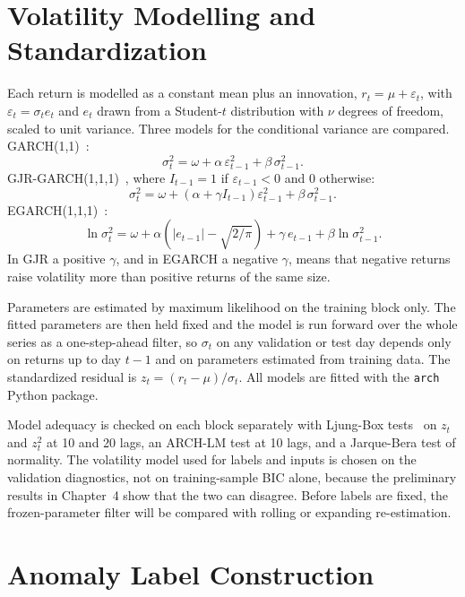 \section{Volatility Modelling and Standardization}
Each return is modelled as a constant mean plus an innovation, $r_t = \mu + \varepsilon_t$,
with $\varepsilon_t = \sigma_t e_t$ and $e_t$ drawn from a Student-$t$ distribution with
$\nu$ degrees of freedom, scaled to unit variance. Three models for the conditional variance
are compared. GARCH(1,1)~\cite{bollerslev1986generalized}:
\begin{equation}
\sigma_t^2 = \omega + \alpha\,\varepsilon_{t-1}^2 + \beta\,\sigma_{t-1}^2 .
\end{equation}
GJR-GARCH(1,1,1)~\cite{glosten1993relation}, where $I_{t-1}=1$ if $\varepsilon_{t-1}<0$ and
$0$ otherwise:
\begin{equation}
\sigma_t^2 = \omega + \left(\alpha + \gamma I_{t-1}\right)\varepsilon_{t-1}^2 + \beta\,\sigma_{t-1}^2 .
\end{equation}
EGARCH(1,1,1)~\cite{nelson1991conditional}:
\begin{equation}
\ln\sigma_t^2 = \omega + \alpha\left(|e_{t-1}| - \sqrt{2/\pi}\right) + \gamma\, e_{t-1} + \beta\ln\sigma_{t-1}^2 .
\end{equation}
In GJR a positive $\gamma$, and in EGARCH a negative $\gamma$, means that negative returns
raise volatility more than positive returns of the same size.

Parameters are estimated by maximum likelihood on the training block only. The fitted
parameters are then held fixed and the model is run forward over the whole series as a
one-step-ahead filter, so $\sigma_t$ on any validation or test day depends only on returns
up to day $t-1$ and on parameters estimated from training data. The standardized residual
is $z_t = (r_t - \mu)/\sigma_t$. All models are fitted with the \texttt{arch} Python package.

Model adequacy is checked on each block separately with Ljung-Box tests~\cite{ljung1978measure}
on $z_t$ and $z_t^2$ at 10 and 20 lags, an ARCH-LM test at 10 lags, and a Jarque-Bera test
of normality. The volatility model used for labels and inputs is chosen on the validation
diagnostics, not on training-sample BIC alone, because the preliminary results in
Chapter~4 show that the two can disagree. Before labels are fixed, the frozen-parameter
filter will be compared with rolling or expanding re-estimation.

\section{Anomaly Label Construction}

